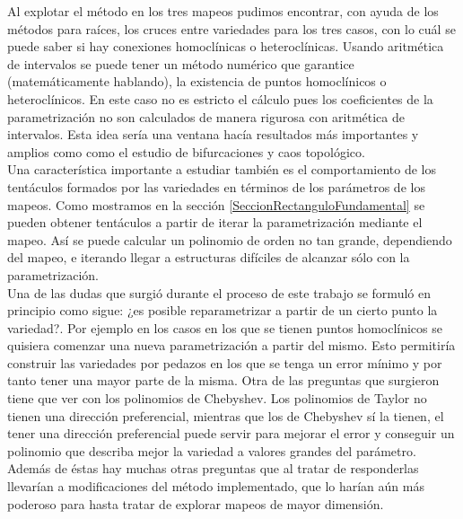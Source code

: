 Al explotar el método en los tres mapeos pudimos encontrar, con ayuda de los métodos para raíces, los cruces entre variedades para los tres casos, con lo cuál se puede saber si hay conexiones homoclínicas o heteroclínicas. Usando aritmética de intervalos se puede tener un método numérico que garantice (matemáticamente hablando), la existencia de puntos homoclínicos o heteroclínicos. En este caso no es estricto el cálculo pues los coeficientes de la parametrización no son calculados de manera rigurosa con aritmética de intervalos. Esta idea sería una ventana hacía resultados más importantes y amplios como como el estudio de bifurcaciones y caos topológico.\\

Una característica importante a estudiar también es el comportamiento de los tentáculos formados por las variedades en términos de los parámetros de los mapeos. Como mostramos en la sección \ref{SeccionRectanguloFundamental} se pueden obtener tentáculos a partir de iterar la parametrización mediante el mapeo. Así se puede calcular un polinomio de orden no tan grande, dependiendo del mapeo, e iterando llegar a estructuras difíciles de alcanzar sólo con la parametrización.\\

Una de las dudas que surgió durante el proceso de este trabajo se formuló en principio como sigue: ¿es posible reparametrizar a partir de un cierto punto la variedad?. Por ejemplo en los casos en los que se tienen puntos homoclínicos se quisiera comenzar una nueva parametrización a partir del mismo. Esto permitiría construir las variedades por pedazos en los que se tenga un error mínimo y por tanto tener una mayor parte de la misma. Otra de las preguntas que surgieron tiene que ver con los polinomios de Chebyshev. Los polinomios de Taylor no tienen una dirección preferencial, mientras que los de Chebyshev sí la tienen, el tener una dirección preferencial puede servir para mejorar el error y conseguir un polinomio que describa mejor la variedad a valores grandes del parámetro. Además de éstas hay muchas otras preguntas que al tratar de responderlas llevarían a modificaciones del método implementado, que lo harían aún más poderoso para hasta tratar de explorar mapeos de mayor dimensión.

